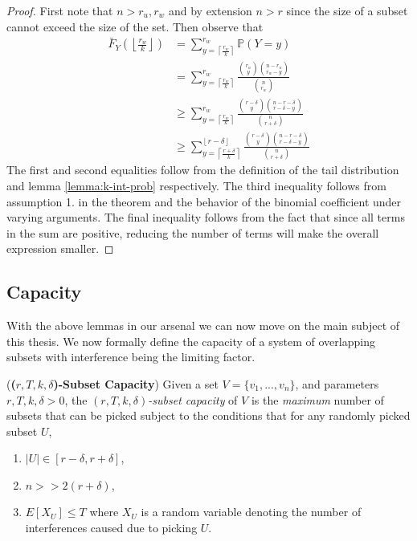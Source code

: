     \begin{proof}  
        First note that $n > r_u, r_w$ and by extension $n > r$ since the size of a subset cannot exceed the size of the set.  
        Then observe that 
        \begin{equation}
            \begin{split}
                \bar{F}_Y\left(\left\lfloor \frac{r_w}{k} \right\rfloor\right)  
                &=
                 \sum_{y = \left\lceil \frac{r_w}{k} \right\rceil}^{r_w} \mathbb{P}(Y=y)  
                \\[2em] &=    \sum_{y = \left\lceil \frac{r_w}{k} \right\rceil}^{r_w} \frac{\binom{r_u}{y} \binom{n-r_u}{r_w-y}}{\binom{n}{r_w}} 
                \\[2em] &\ge  \sum_{y = \left\lceil \frac{r_w}{k} \right\rceil}^{r_w} \frac{\binom{r-\delta}{y} \binom{n-r-\delta}{r-\delta-y}}{\binom{n}{r+\delta}}  
                \\[2em] &\ge  \sum_{y = \left\lceil \frac{r+\delta}{k} \right\rceil}^{\left\lfloor r - \delta \right\rfloor} \frac{\binom{r-\delta}{y} \binom{n-r-\delta}{r-\delta-y}}{\binom{n}{r+\delta}}  
            \end{split}
        \end{equation}
        The first and second equalities follow from the definition of the tail distribution and lemma \ref{lemma:k-int-prob} respectively. The third inequality follows from assumption 1. in the theorem and the behavior of the binomial coefficient under varying arguments. The final inequality follows from the fact that since all terms in the sum are positive, reducing the number of terms will make the overall expression smaller.
        
    \end{proof}

    \subsection{Capacity}
    With the above lemmas in our arsenal we can now move on  the main subject of this thesis. We now formally define the capacity of a system of overlapping subsets with interference being the limiting factor. 

    \begin{definition} (\textbf{(\textit{$r,T,k,\delta$})-Subset Capacity}) Given a set $V = \{v_1,...,v_n\}$, and parameters $r, T, k, \delta > 0$, the \textit{$(r,T,k,\delta)$-subset capacity} of $V$ is the \textit{maximum} number of subsets that can be picked subject to the conditions that for any randomly picked subset $U$,
        \begin{enumerate}
            \item $|U| \in [r-\delta,r+\delta]$,
            \item $n >> 2(r+\delta)$,
            \item \label{equ:cap-bound-expected}$E[X_U] \le T$ where $X_U$ is a random variable denoting the number of interferences caused due to picking $U$. 
        \end{enumerate}
    \end{definition}


